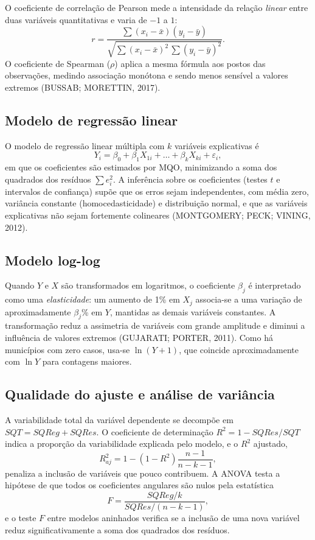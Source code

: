 \documentclass[12pt,a4paper]{article}
\begin{document}
	O coeficiente de correlação de Pearson mede a intensidade da relação \emph{linear} entre duas variáveis quantitativas e varia de $-1$ a $1$:
	\[
	r = \frac{\sum (x_i-\bar{x})(y_i-\bar{y})}{\sqrt{\sum (x_i-\bar{x})^2\,\sum (y_i-\bar{y})^2}}.
	\]
	O coeficiente de Spearman ($\rho$) aplica a mesma fórmula aos postos das observações, medindo associação monótona e sendo menos sensível a valores extremos (BUSSAB; MORETTIN, 2017).
	
	\subsection{Modelo de regressão linear}
	
	O modelo de regressão linear múltipla com $k$ variáveis explicativas é
	\[
	Y_i = \beta_0 + \beta_1 X_{1i} + \dots + \beta_k X_{ki} + \varepsilon_i,
	\]
	em que os coeficientes são estimados por MQO, minimizando a soma dos quadrados dos resíduos $\sum e_i^2$. A inferência sobre os coeficientes (testes $t$ e intervalos de confiança) supõe que os erros sejam independentes, com média zero, variância constante (homocedasticidade) e distribuição normal, e que as variáveis explicativas não sejam fortemente colineares (MONTGOMERY; PECK; VINING, 2012).
	
	\subsection{Modelo log-log}
	
	Quando $Y$ e $X$ são transformados em logaritmos, o coeficiente $\beta_j$ é interpretado como uma \emph{elasticidade}: um aumento de 1\% em $X_j$ associa-se a uma variação de aproximadamente $\beta_j$\% em $Y$, mantidas as demais variáveis constantes. A transformação reduz a assimetria de variáveis com grande amplitude e diminui a influência de valores extremos (GUJARATI; PORTER, 2011). Como há municípios com zero casos, usa-se $\ln(Y+1)$, que coincide aproximadamente com $\ln Y$ para contagens maiores.
	
	\subsection{Qualidade do ajuste e análise de variância}
	
	A variabilidade total da variável dependente se decompõe em $SQT = SQReg + SQRes$. O coeficiente de determinação $R^2 = 1 - SQRes/SQT$ indica a proporção da variabilidade explicada pelo modelo, e o $R^2$ ajustado,
	\[
	R^2_{aj} = 1 - (1-R^2)\frac{n-1}{n-k-1},
	\]
	penaliza a inclusão de variáveis que pouco contribuem. A ANOVA testa a hipótese de que todos os coeficientes angulares são nulos pela estatística
	\[
	F = \frac{SQReg/k}{SQRes/(n-k-1)},
	\]
	e o teste $F$ entre modelos aninhados verifica se a inclusão de uma nova variável reduz significativamente a soma dos quadrados dos resíduos.
	
\end{document}
